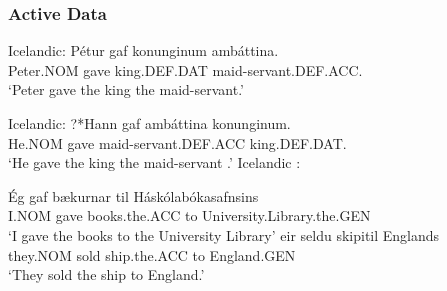 \subsubsection{Active Data}
\begin{exe}
	 Icelandic:
		\gll P\'{e}tur gaf konunginum amb\'{a}ttina.\\
		Peter.NOM gave king.DEF.DAT maid-servant.DEF.ACC.\\
		\trans `Peter gave the king the maid-servant.'

	 Icelandic:
		\gll ?*Hann gaf amb\'attina konunginum.\\
		He.NOM gave maid-servant.DEF.ACC king.DEF.DAT. \\
		\trans `He gave the king the maid-servant \citep[ex 14b]{Dehe.2004}.'
	 Icelandic \citep{Thrainsson.2007}:
		\begin{xlist}
		\ex \gll \'{E}g gaf b\ae kurnar til H\'ask\'olab\'okasafnsins\\
		I.NOM gave books.the.ACC to University.Library.the.GEN\\
		\trans `I gave the books to the University Library'
		\ex \gll \th eir seldu skipi\dh  til Englands\\
		they.NOM sold ship.the.ACC to England.GEN\\
		\trans `They sold the ship to England.'
		\end{xlist}

\end{exe}
